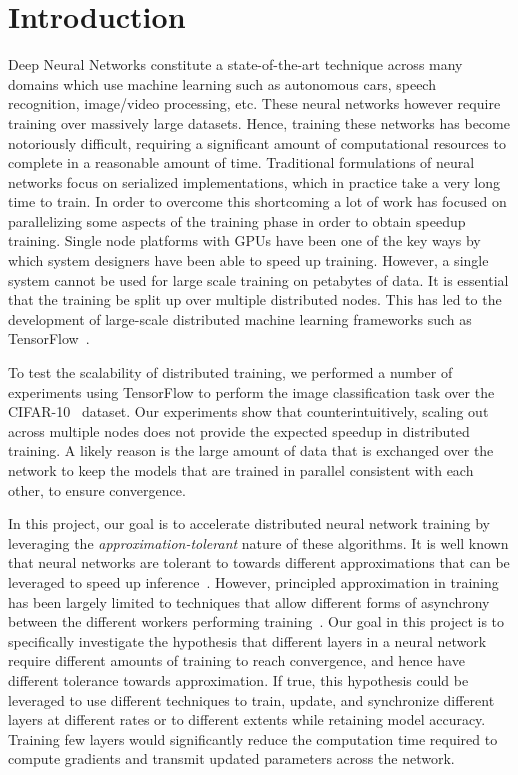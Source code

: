 \section{Introduction}

Deep Neural Networks constitute a state-of-the-art technique across many domains which use machine learning such as autonomous cars, speech recognition, image/video processing, etc. These neural networks however require training over massively large datasets. Hence, training these networks has become notoriously difficult, requiring a significant amount of computational resources to complete in a reasonable amount of time. Traditional formulations of neural networks focus on serialized implementations, which in practice take a very long time to train. In order to overcome this shortcoming a lot of work has focused on parallelizing some aspects of the training phase in order to obtain speedup training. Single node platforms with GPUs have been one of the key ways by which system designers have been able to speed up training. However, a single system cannot be used for large scale training on petabytes of data. It is essential that the training be split up over multiple distributed nodes. This has led to the development of large-scale distributed machine learning frameworks such as TensorFlow~\cite{tensorflow}. 

To test the scalability of distributed training, we performed a number of experiments using TensorFlow to perform the image classification task over the CIFAR-10~\cite{cifar10} dataset. Our experiments show that counterintuitively, scaling out across multiple nodes does not provide the expected speedup in distributed training. A likely reason is the large amount of data that is exchanged over the network to keep the models that are trained in parallel consistent with each other, to ensure convergence. 

In this project, our goal is to accelerate distributed neural network training by leveraging the \emph{approximation-tolerant} nature of these algorithms. It is well known that neural networks are tolerant to towards different approximations that can be leveraged to speed up inference~\cite{compresseddnn}\cite{eie}. However, principled approximation in training has been largely limited to techniques that allow different forms of asynchrony between the different workers performing training~\cite{ganger,garth,communicationthesis}. Our goal in this project is to specifically investigate the hypothesis that different layers in a neural network require different amounts of training to reach convergence, and hence have different tolerance towards approximation. If true, this hypothesis could be leveraged to use different techniques to train, update, and synchronize different layers at different rates or to different extents while retaining model accuracy. Training few layers would significantly reduce the computation time required to compute gradients and transmit updated parameters across the network.  

